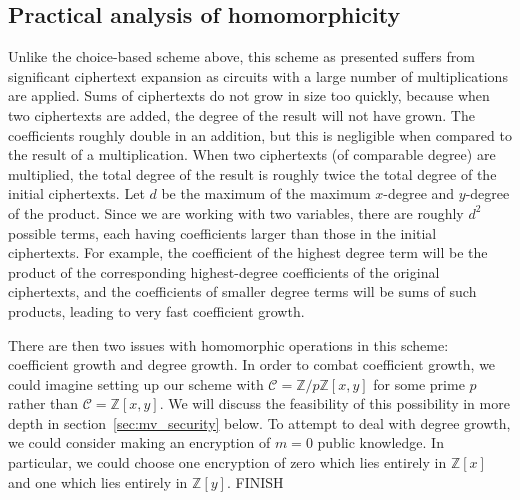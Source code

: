 \documentclass[11pt]{report}
\newcommand{\Zx}{\mathbb{Z}[x]}
\newcommand{\Zy}{\mathbb{Z}[y]}
\newcommand{\Zxy}{\mathbb{Z}[x,y]}
\newcommand{\Zpxy}{\mathbb{Z}/p\mathbb{Z}[x,y]}
\begin{document}
\subsection{Practical analysis of homomorphicity}
\label{sec:mv_hom_analysis}
Unlike the choice-based scheme above, this scheme as presented suffers from significant ciphertext expansion as circuits with a large number of multiplications are applied. Sums of ciphertexts do not grow in size too quickly, because when two ciphertexts are added, the degree of the result will not have grown. The coefficients roughly double in an addition, but this is negligible when compared to the result of a multiplication. When two ciphertexts (of comparable degree) are multiplied, the total degree of the result is roughly twice the total degree of the initial ciphertexts. Let $d$ be the maximum of the maximum $x$-degree and $y$-degree of the product. Since we are working with two variables, there are roughly $d^2$ possible terms, each having coefficients larger than those in the initial ciphertexts. For example, the coefficient of the highest degree term will be the product of the corresponding highest-degree coefficients of the original ciphertexts, and the coefficients of smaller degree terms will be sums of such products, leading to very fast coefficient growth.

There are then two issues with homomorphic operations in this scheme: coefficient growth and degree growth. In order to combat coefficient growth, we could imagine setting up our scheme with $\mathcal{C} = \Zpxy$ for some prime $p$ rather than $\mathcal{C} = \Zxy$. We will discuss the feasibility of this possibility in more depth in section~\ref{sec:mv_security} below. To attempt to deal with degree growth, we could consider making an encryption of $m=0$ public knowledge. In particular, we could choose one encryption of zero which lies entirely in $\Zx$ and one which lies entirely in $\Zy$. FINISH
\end{document}
